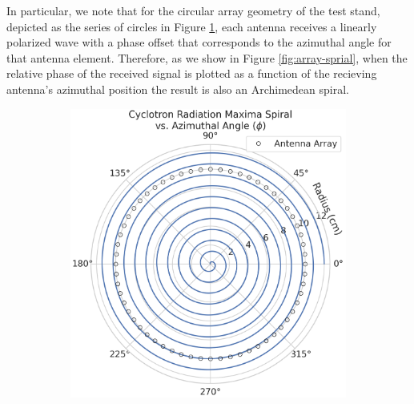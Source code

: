 In particular, we note that for the circular array geometry of the test stand, depicted as the series of circles in Figure \ref{fig:arch-spiral}, each antenna receives a linearly polarized wave with a phase offset that corresponds to the azimuthal angle for that antenna element. Therefore, as we show in Figure \ref{fig:array-sprial}, when the relative phase of the received signal is plotted as a function of the recieving antenna's azimuthal position the result is also an Archimedean spiral. 

\begin{figure}[h]
    \centering
    \begin{subfigure}[b]{0.48\textwidth}
        \centering
        \includegraphics[width=.9\textwidth]{figs/Chapter-5/221012_cyclotron_spiral_polar.png}
        \caption{\label{fig:arch-spiral}}
    \end{subfigure}
    \hfill
    \begin{subfigure}[b]{0.48\textwidth}
        \centering

\end{subfigure}
\end{figure}
